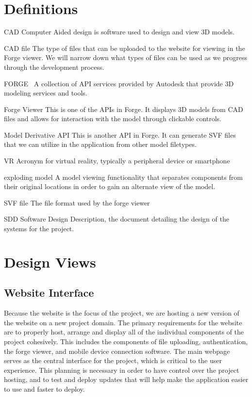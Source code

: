 \documentclass[letterpaper, 10pt, draftclsnofoot, compsoc, onecolumn]{IEEEtran}
\begin{document}
%
%

\section{Definitions}
\begin{description}
	\item{CAD} Computer Aided design is software used to design and view 3D models.

	\item{CAD file} The type of files that can be uploaded to the website for viewing in the Forge viewer. 
	We will  narrow down what types of files can be used as we progress through the development process.

	\item{FORGE}~\cite{forge2016} A collection of API services provided by Autodesk that provide 3D modeling services and tools.

	\item{Forge Viewer} This is one of the APIs in Forge. It displays 3D models from CAD files and allows for interaction with the model through clickable controls.
	
	\item{Model Derivative API} This is another API in Forge. It can generate SVF files that we can utilize in the application from other model filetypes.
	
	\item{VR} Acronym for virtual reality, typically a peripheral device or smartphone

	\item{exploding model} A model viewing functionality that separates components from their original locations in order to gain an alternate view of the model.

	\item{SVF file} The file format used by the forge viewer
	
	\item{SDD} Software Design Description, the document detailing the design of the systems for the project.
	
\end{description} 

\section{Design Views}
\subsection{Website Interface}
Because the website is the focus of the project, we are hosting a new version of the website on a new project domain. The primary requirements for the website are to properly host, arrange and display all of the individual components of the project cohesively. This includes the components of file uploading, authentication, the forge viewer, and mobile device connection software. The main webpage serves as the central interface for the project, which is critical to the user experience. This planning is necessary in order to have control over the project hosting, and to test and deploy updates that will help make the application easier to use and faster to deploy.
\end{document}
